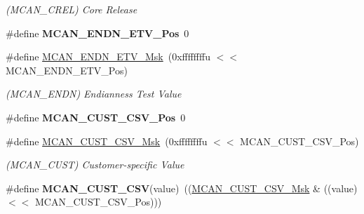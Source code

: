 \begin{DoxyCompactItemize}
\begin{DoxyCompactList}\small\item\em (M\+C\+A\+N\+\_\+\+C\+R\+EL) Core Release \end{DoxyCompactList}\item 
\mbox{\label{group__SAMV71__MCAN_gaf50264d0452b41d60442e4b20af81261}} 
\#define {\bfseries M\+C\+A\+N\+\_\+\+E\+N\+D\+N\+\_\+\+E\+T\+V\+\_\+\+Pos}~0
\item 
\mbox{\label{group__SAMV71__MCAN_ga8252ec7b2150620baa6fb142b9cb8225}} 
\#define \mbox{\hyperlink{group__SAMV71__MCAN_ga8252ec7b2150620baa6fb142b9cb8225}{M\+C\+A\+N\+\_\+\+E\+N\+D\+N\+\_\+\+E\+T\+V\+\_\+\+Msk}}~(0xffffffffu $<$$<$ M\+C\+A\+N\+\_\+\+E\+N\+D\+N\+\_\+\+E\+T\+V\+\_\+\+Pos)
\begin{DoxyCompactList}\small\item\em (M\+C\+A\+N\+\_\+\+E\+N\+DN) Endianness Test Value \end{DoxyCompactList}\item 
\mbox{\label{group__SAMV71__MCAN_gaf4c8e16054ae8c19081e637a94dc80d3}} 
\#define {\bfseries M\+C\+A\+N\+\_\+\+C\+U\+S\+T\+\_\+\+C\+S\+V\+\_\+\+Pos}~0
\item 
\mbox{\label{group__SAMV71__MCAN_ga06ab3cbe5adf56e5e3012b14f3226b8f}} 
\#define \mbox{\hyperlink{group__SAMV71__MCAN_ga06ab3cbe5adf56e5e3012b14f3226b8f}{M\+C\+A\+N\+\_\+\+C\+U\+S\+T\+\_\+\+C\+S\+V\+\_\+\+Msk}}~(0xffffffffu $<$$<$ M\+C\+A\+N\+\_\+\+C\+U\+S\+T\+\_\+\+C\+S\+V\+\_\+\+Pos)
\begin{DoxyCompactList}\small\item\em (M\+C\+A\+N\+\_\+\+C\+U\+ST) Customer-\/specific Value \end{DoxyCompactList}\item 
\mbox{\label{group__SAMV71__MCAN_ga0949acddf43859f0dc102aa87590c3c8}} 
\#define {\bfseries M\+C\+A\+N\+\_\+\+C\+U\+S\+T\+\_\+\+C\+SV}(value)~((\mbox{\hyperlink{group__SAMV71__MCAN_ga06ab3cbe5adf56e5e3012b14f3226b8f}{M\+C\+A\+N\+\_\+\+C\+U\+S\+T\+\_\+\+C\+S\+V\+\_\+\+Msk}} \& ((value) $<$$<$ M\+C\+A\+N\+\_\+\+C\+U\+S\+T\+\_\+\+C\+S\+V\+\_\+\+Pos)))
\item 
\mbox{\label{group__SAMV71__MCAN_ga4e9c7aa75adc93d769bda7e441d1f7c3}} 
$$
\end{DoxyCompactItemize}
